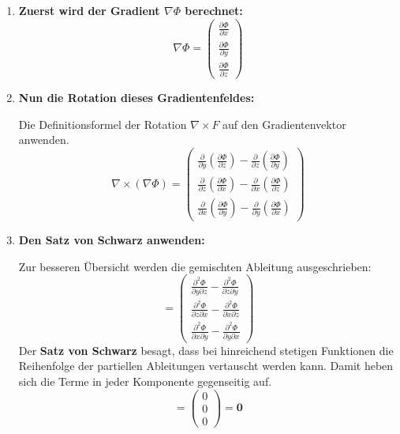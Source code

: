 \begin{enumerate}
    \item \textbf{Zuerst wird der Gradient $\nabla\Phi$ berechnet:}
    $$
    \nabla \Phi =
    \begin{pmatrix}
        \frac{\partial \Phi}{\partial x} \\
        \frac{\partial \Phi}{\partial y} \\
        \frac{\partial \Phi}{\partial z}
    \end{pmatrix}
    $$

    \item \textbf{Nun die Rotation dieses Gradientenfeldes:}
    
    Die Definitionsformel der Rotation $\nabla \times F$ auf den Gradientenvektor anwenden.
    $$
    \nabla \times (\nabla \Phi) =
    \begin{pmatrix}
        \frac{\partial}{\partial y}\left(\frac{\partial \Phi}{\partial z}\right) - \frac{\partial}{\partial z}\left(\frac{\partial \Phi}{\partial y}\right) \\
        \frac{\partial}{\partial z}\left(\frac{\partial \Phi}{\partial x}\right) - \frac{\partial}{\partial x}\left(\frac{\partial \Phi}{\partial z}\right) \\
        \frac{\partial}{\partial x}\left(\frac{\partial \Phi}{\partial y}\right) - \frac{\partial}{\partial y}\left(\frac{\partial \Phi}{\partial x}\right)
    \end{pmatrix}
    $$

    \item \textbf{Den Satz von Schwarz anwenden:}
    
    Zur besseren Übersicht werden die gemischten Ableitung ausgeschrieben:
    $$
    =
    \begin{pmatrix}
        \frac{\partial^2 \Phi}{\partial y \partial z} - \frac{\partial^2 \Phi}{\partial z \partial y} \\
        \frac{\partial^2 \Phi}{\partial z \partial x} - \frac{\partial^2 \Phi}{\partial x \partial z} \\
        \frac{\partial^2 \Phi}{\partial x \partial y} - \frac{\partial^2 \Phi}{\partial y \partial x}
    \end{pmatrix}
    $$
    Der \textbf{Satz von Schwarz} besagt, dass bei hinreichend stetigen Funktionen die Reihenfolge der partiellen Ableitungen vertauscht werden kann. Damit heben sich die Terme in jeder Komponente gegenseitig auf.
    $$
    =
    \begin{pmatrix}
        0 \\
        0 \\
        0
    \end{pmatrix} = \mathbf{0}
    $$
\end{enumerate}

